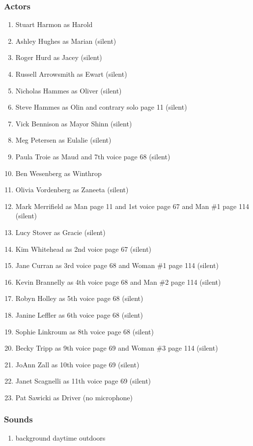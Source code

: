 \subsubsection{Actors}
\begin{enumerate}
\item Stuart Harmon as Harold
\item Ashley Hughes as Marian (silent)
\item Roger Hurd as Jacey (silent)
\item Russell Arrowsmith as Ewart (silent)
\item Nicholas Hammes as Oliver (silent)
\item Steve Hammes as Olin and contrary solo page 11 (silent)
\item Vick Bennison as Mayor Shinn (silent)
\item Meg Petersen as Eulalie (silent)
\item Paula Troie as Maud and 7th voice page 68 (silent)
\item Ben Wesenberg as Winthrop
\item Olivia Vordenberg as Zaneeta (silent)
\item Mark Merrifield as Man page 11 and 1st voice page 67 and Man \#1 page 114 (silent)
\item Lucy Stover as Gracie (silent)
\item Kim Whitehead as 2nd voice page 67 (silent)
\item Jane Curran as 3rd voice page 68 and Woman \#1 page 114 (silent)
\item Kevin Brannelly as 4th voice page 68 and Man \#2 page 114 (silent)
\item Robyn Holley as 5th voice page 68 (silent)
\item Janine Leffler as 6th voice page 68 (silent)
\item Sophie Linkroum as 8th voice page 68 (silent)
\item Becky Tripp as 9th voice page 69 and Woman \#3 page 114 (silent)
\item JoAnn Zall as 10th voice page 69 (silent)
\item Janet Scagnelli as 11th voice page 69 (silent)
\item Pat Sawicki as Driver (no microphone)
\end{enumerate}

\subsubsection{Sounds}
\begin{enumerate}
\item background daytime outdoors
\end{enumerate}
